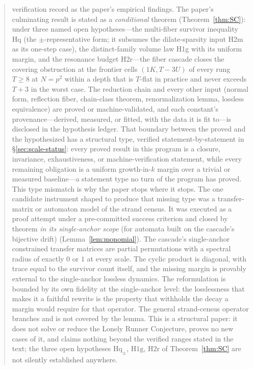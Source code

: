 \begin{abstract}
verification record as the paper's empirical findings.
The paper's culminating result is stated as a \emph{conditional}
theorem (Theorem~\ref{thm:SC}): under three named open hypotheses---the
multi-fiber survivor inequality Hq (the $\pm$-representative form; it
subsumes the dilate-sparsity input H2m as its one-step case),
the distinct-family volume law H1g with its uniform margin, and the
resonance budget H2r---the fiber cascade closes the covering
obstruction at the frontier cells $(1K,T{-}3U)$ of every rung $T\ge 8$
at $N=p^2$ within a depth that is $T$-flat in practice and never
exceeds $T+3$ in the worst case. The reduction chain and every other
input (normal form, reflection fiber, chain-class theorem,
renormalization lemma, lossless equivalence) are proved or
machine-validated, and each constant's provenance---derived, measured,
or fitted, with the data it is fit to---is disclosed in the hypothesis
ledger.
That boundary between the proved and the hypothesized has a structural
type, verified statement-by-statement in \S\ref{sec:scale-status}: every
proved result in this program is a closure, invariance, exhaustiveness,
or machine-verification statement, while every remaining obligation is a
uniform growth-in-$k$ margin over a trivial or measured baseline---a
statement type no turn of the program has proved. This type mismatch is
why the paper stops where it stops. The one candidate instrument
shaped to produce that missing type was a transfer-matrix or automaton
model of the strand census. It was executed as a proof attempt under a
pre-committed success criterion and closed by theorem \emph{in its
single-anchor scope} (for automata built on the cascade's bijective
drift) (Lemma~\ref{lem:monomial}). The cascade's single-anchor
constrained transfer matrices are partial permutations with a spectral
radius of exactly $0$ or $1$ at every scale. The cyclic product is
diagonal, with trace equal to the survivor count itself, and the missing
margin is provably external to the single-anchor lossless dynamics. The
reformulation is bounded by its own fidelity at the single-anchor level:
the losslessness that makes it a faithful rewrite is the property that
withholds the decay a margin would require for that operator. The
general strand-census operator branches and is not covered by the lemma.
This is a structural paper: it does not solve or reduce the Lonely
Runner Conjecture, proves no new cases of it, and claims nothing beyond
the verified ranges stated in the text; the three open hypotheses
$\mathrm{Hq}_\pm$, $\mathrm{H1g}$, $\mathrm{H2r}$ of
Theorem~\ref{thm:SC} are not silently established anywhere.
\end{abstract}

